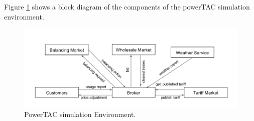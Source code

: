 Figure \ref{fig:simulation-environment}  shows a block diagram of the components of the powerTAC simulation environment.

\begin{figure}[h!]
  \includegraphics[width=\linewidth]{simulation-environment.png}
  \caption{PowerTAC simulation Environment.}
  \label{fig:simulation-environment}
\end{figure}

